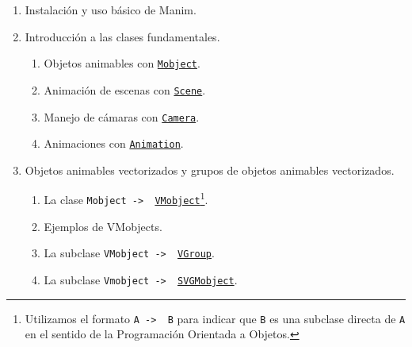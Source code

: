 \documentclass[a4paper]{article}
\begin{document}
\begin{enumerate}

    \item Instalación y uso básico de Manim.

    \item Introducción a las clases fundamentales.
   \begin{enumerate}[label=2.\arabic*]
       \item Objetos animables con \href{https://docs.manim.community/en/v0.16.0.post0/reference/manim.mobject.mobject.Mobject.html}{\texttt{Mobject}}.

       \item Animación de escenas con \href{https://docs.manim.community/en/v0.16.0.post0/reference/manim.scene.scene.Scene.html}{\texttt{Scene}}.

       \item Manejo de cámaras con \href{https://docs.manim.community/en/v0.16.0.post0/reference/manim.camera.camera.Camera.html?highlight=Camera}{\texttt{Camera}}.

       \item Animaciones con \href{https://docs.manim.community/en/v0.16.0.post0/reference/manim.animation.animation.Animation.html#}{\texttt{Animation}}.
   \end{enumerate}

    \item Objetos animables vectorizados y grupos de objetos animables vectorizados.
    \begin{enumerate}[label=3.\arabic*]

        \item La clase \texttt{Mobject -> \ \href{https://docs.manim.community/en/v0.16.0.post0/reference/manim.mobject.types.vectorized_mobject.VMobject.html?highlight=VMobject}{VMobject}}\footnote{Utilizamos el formato \texttt{A -> \ B} para indicar que \texttt{B} es una subclase directa de \texttt{A} en el sentido de la Programación Orientada a Objetos.}.

        \item Ejemplos de VMobjects.
    
        \item La subclase \texttt{VMobject -> \ \href{https://docs.manim.community/en/v0.16.0/reference/manim.mobject.types.vectorized_mobject.VGroup.html?highlight=VGroup}{VGroup}}.

        \item La subclase \texttt{Vmobject -> \ \href{https://docs.manim.community/en/v0.16.0.post0/reference/manim.mobject.svg.svg_mobject.SVGMobject.html}{SVGMobject}}.
    \end{enumerate}


\end{enumerate}
\end{document}
